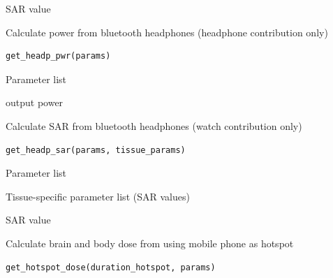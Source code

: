 \documentclass[a4paper]{book}
\begin{document}
%
\begin{Value}
SAR value
\end{Value}
%
\begin{Description}
Calculate power from bluetooth headphones (headphone contribution only)
\end{Description}
%
\begin{Usage}
\begin{verbatim}
get_headp_pwr(params)
\end{verbatim}
\end{Usage}
%
\begin{Arguments}
\begin{ldescription}
\item[\code{params}] Parameter list
\end{ldescription}
\end{Arguments}
%
\begin{Value}
output power
\end{Value}
%
\begin{Description}
Calculate SAR from bluetooth headphones (watch contribution only)
\end{Description}
%
\begin{Usage}
\begin{verbatim}
get_headp_sar(params, tissue_params)
\end{verbatim}
\end{Usage}
%
\begin{Arguments}
\begin{ldescription}
\item[\code{params}] Parameter list

\item[\code{tissue\_params}] Tissue-specific parameter list (SAR values)
\end{ldescription}
\end{Arguments}
%
\begin{Value}
SAR value
\end{Value}
%
\begin{Description}
Calculate brain and body dose from using mobile phone as hotspot
\end{Description}
%
\begin{Usage}
\begin{verbatim}
get_hotspot_dose(duration_hotspot, params)
\end{verbatim}
\end{Usage}
\end{document}
